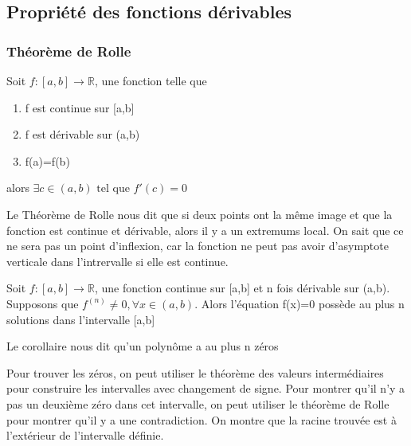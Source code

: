 \documentclass{article}
\begin{document}
\subsection{Propriété des fonctions dérivables}

\subsubsection{Théorème de Rolle}

\begin{definition}
    Soit $f:[a,b] \to \mathbb{R}$, une fonction telle que
    \begin{enumerate}
	\item f est continue sur [a,b]
	\item f est dérivable sur (a,b)
	\item f(a)=f(b)
    \end{enumerate}
    alors $\exists c \in (a,b) \text{ tel que } f'(c)=0$
\end{definition}

\begin{remark}
    Le Théorème de Rolle nous dit que si deux points ont la même
    image et que la fonction est continue et dérivable, alors il y
    a un extremums local. On sait que ce ne sera pas un point
    d'inflexion, car la fonction ne peut pas avoir d'asymptote
    verticale dans l'intrervalle si elle est continue.
\end{remark}

\begin{corollary}
    Soit $f:[a,b] \to \mathbb{R}$, une fonction continue sur [a,b] et
    n fois dérivable sur (a,b). Supposons que $f^(n) \neq 0, \forall
    x \in (a,b)$. Alors l'équation f(x)=0 possède au plus n solutions
    dans l'intervalle [a,b]
\end{corollary}

\begin{remark}
    Le corollaire nous dit qu'un polynôme a au plus n zéros
\end{remark}

\begin{problem}
    Pour trouver les zéros, on peut utiliser le théorème des
    valeurs intermédiaires pour construire les intervalles avec changement
    de signe. Pour montrer qu'il n'y a pas un deuxième zéro dans cet
    intervalle, on peut utiliser le théorème de Rolle pour montrer qu'il
    y a une contradiction. On montre que la racine trouvée est à
    l'extérieur de l'intervalle définie.
\end{problem}
\end{document}
